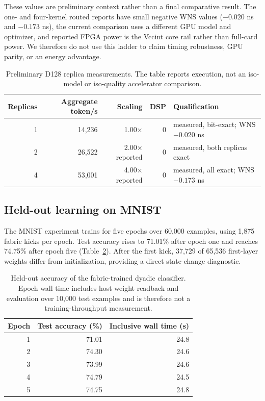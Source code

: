 \documentclass[10pt]{article}
\begin{document}
These values are preliminary context rather than a final comparative result.
The one- and four-kernel routed reports have small negative WNS values
($-0.020$ ns and $-0.173$ ns), the current comparison uses a different GPU
model and optimizer, and reported FPGA power is the Vccint core rail rather
than full-card power.  We therefore do not use this ladder to claim timing
robustness, GPU parity, or an energy advantage.

\begin{table}[t]
\centering
\caption{Preliminary D128 replica measurements.  The table reports execution,
not an iso-model or iso-quality accelerator comparison.}
\label{tab:d128}
\small
\begin{tabular}{rrrrl}
\toprule
Replicas & Aggregate token/s & Scaling & DSP & Qualification \\
\midrule
1 & 14,236 & 1.00$\times$ & 0 & measured, bit-exact; WNS $-0.020$ ns \\
2 & 26,522 & 2.00$\times$ reported & 0 & measured, both replicas exact \\
4 & 53,001 & 4.00$\times$ reported & 0 & measured, all exact; WNS $-0.173$ ns \\
\bottomrule
\end{tabular}
\end{table}

\subsection{Held-out learning on MNIST}

The MNIST experiment trains for five epochs over 60,000 examples, using 1,875
fabric kicks per epoch.  Test accuracy rises to 71.01\% after epoch one and
reaches 74.75\% after epoch five (Table~\ref{tab:mnist}).  After the first kick,
37,729 of 65,536 first-layer weights differ from initialization, providing a
direct state-change diagnostic.

\begin{table}[t]
\centering
\caption{Held-out accuracy of the fabric-trained dyadic classifier.  Epoch wall
time includes host weight readback and evaluation over 10,000 test examples and
is therefore not a training-throughput measurement.}
\label{tab:mnist}
\small
\begin{tabular}{rrr}
\toprule
Epoch & Test accuracy (\%) & Inclusive wall time (s) \\
\midrule
1 & 71.01 & 24.8 \\
2 & 74.30 & 24.6 \\
3 & 73.99 & 24.6 \\
4 & 74.79 & 24.5 \\
5 & 74.75 & 24.8 \\
\bottomrule
\end{tabular}
\end{table}
\end{document}
